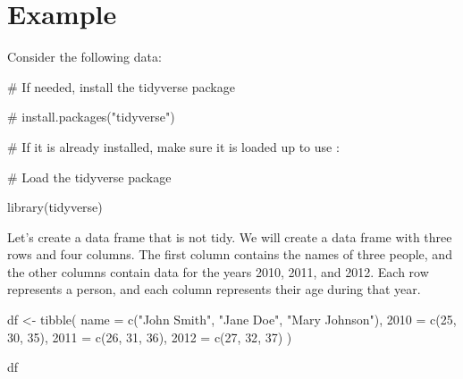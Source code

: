 \documentclass[
  letterpaper,
  DIV=11,
  numbers=noendperiod]{scrreprt}
\newenvironment{Shaded}{\begin{snugshade}}{\end{snugshade}}
\newcommand{\AttributeTok}[1]{\textcolor[rgb]{0.40,0.45,0.13}{#1}}
\newcommand{\CommentTok}[1]{\textcolor[rgb]{0.37,0.37,0.37}{#1}}
\newcommand{\DecValTok}[1]{\textcolor[rgb]{0.68,0.00,0.00}{#1}}
\newcommand{\FunctionTok}[1]{\textcolor[rgb]{0.28,0.35,0.67}{#1}}
\newcommand{\NormalTok}[1]{\textcolor[rgb]{0.00,0.23,0.31}{#1}}
\newcommand{\OtherTok}[1]{\textcolor[rgb]{0.00,0.23,0.31}{#1}}
\newcommand{\StringTok}[1]{\textcolor[rgb]{0.13,0.47,0.30}{#1}}
\begin{document}
\section*{Example}\label{example}


Consider the following data:

\begin{Shaded}
\begin{Highlighting}[]
\CommentTok{\# If needed, install the tidyverse package}

\CommentTok{\# install.packages("tidyverse")}

\CommentTok{\# If it is already installed, make sure it is loaded up to use :}

\CommentTok{\# Load the tidyverse package}

\FunctionTok{library}\NormalTok{(tidyverse)}
\end{Highlighting}
\end{Shaded}

Let's create a data frame that is not tidy. We will create a data frame
with three rows and four columns. The first column contains the names of
three people, and the other columns contain data for the years 2010,
2011, and 2012. Each row represents a person, and each column represents
their age during that year.

\begin{Shaded}
\begin{Highlighting}[]
\NormalTok{df }\OtherTok{\textless{}{-}} \FunctionTok{tibble}\NormalTok{(}
  \AttributeTok{name =} \FunctionTok{c}\NormalTok{(}\StringTok{"John Smith"}\NormalTok{, }\StringTok{"Jane Doe"}\NormalTok{, }\StringTok{"Mary Johnson"}\NormalTok{),}
  \StringTok{\textasciigrave{}}\AttributeTok{2010}\StringTok{\textasciigrave{}} \OtherTok{=} \FunctionTok{c}\NormalTok{(}\DecValTok{25}\NormalTok{, }\DecValTok{30}\NormalTok{, }\DecValTok{35}\NormalTok{),}
  \StringTok{\textasciigrave{}}\AttributeTok{2011}\StringTok{\textasciigrave{}} \OtherTok{=} \FunctionTok{c}\NormalTok{(}\DecValTok{26}\NormalTok{, }\DecValTok{31}\NormalTok{, }\DecValTok{36}\NormalTok{),}
  \StringTok{\textasciigrave{}}\AttributeTok{2012}\StringTok{\textasciigrave{}} \OtherTok{=} \FunctionTok{c}\NormalTok{(}\DecValTok{27}\NormalTok{, }\DecValTok{32}\NormalTok{, }\DecValTok{37}\NormalTok{)}
\NormalTok{)}

\NormalTok{df}
\end{Highlighting}
\end{Shaded}
\end{document}
